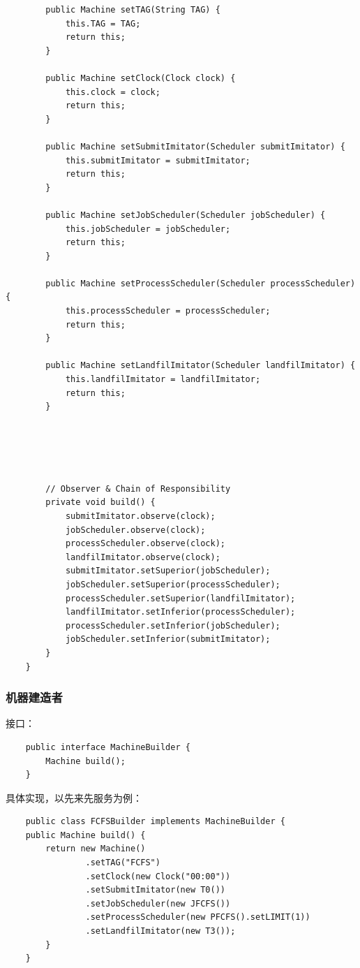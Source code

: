 \documentclass[12pt, a4paper, UTF8]{ctexart}
\begin{document}
\begin{verbatim}
        public Machine setTAG(String TAG) {
            this.TAG = TAG;
            return this;
        }

        public Machine setClock(Clock clock) {
            this.clock = clock;
            return this;
        }

        public Machine setSubmitImitator(Scheduler submitImitator) {
            this.submitImitator = submitImitator;
            return this;
        }

        public Machine setJobScheduler(Scheduler jobScheduler) {
            this.jobScheduler = jobScheduler;
            return this;
        }

        public Machine setProcessScheduler(Scheduler processScheduler) {
            this.processScheduler = processScheduler;
            return this;
        }

        public Machine setLandfilImitator(Scheduler landfilImitator) {
            this.landfilImitator = landfilImitator;
            return this;
        }





        // Observer & Chain of Responsibility
        private void build() {
            submitImitator.observe(clock);
            jobScheduler.observe(clock);
            processScheduler.observe(clock);
            landfilImitator.observe(clock);
            submitImitator.setSuperior(jobScheduler);
            jobScheduler.setSuperior(processScheduler);
            processScheduler.setSuperior(landfilImitator);
            landfilImitator.setInferior(processScheduler);
            processScheduler.setInferior(jobScheduler);
            jobScheduler.setInferior(submitImitator);
        }
    }

\end{verbatim}

\newpage
\subsubsection{机器建造者}
接口：
\begin{verbatim}
    public interface MachineBuilder {
        Machine build();
    }
\end{verbatim}

具体实现，以先来先服务为例：
\begin{verbatim}
    public class FCFSBuilder implements MachineBuilder {
    public Machine build() {
        return new Machine()
                .setTAG("FCFS")
                .setClock(new Clock("00:00"))
                .setSubmitImitator(new T0())
                .setJobScheduler(new JFCFS())
                .setProcessScheduler(new PFCFS().setLIMIT(1))
                .setLandfilImitator(new T3());
        }
    }
\end{verbatim}
\end{document}
